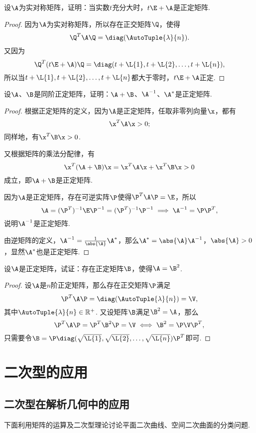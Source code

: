 \begin{example}
设\(\A\)为实对称矩阵，证明：当实数\(t\)充分大时，\(t\E+\A\)是正定矩阵.
\begin{proof}
因为\(\A\)为实对称矩阵，所以存在正交矩阵\(\Q\)，使得\[
\Q^T\A\Q = \diag(\AutoTuple{\lambda}{n}).
\]又因为\[
\Q^T(t\E+\A)\Q
= \diag(t+\L{1},t+\L{2},\dotsc,t+\L{n}),
\]所以当\(t+\L{1},t+\L{2},\dotsc,t+\L{n}\)都大于零时，\(t\E+\A\)正定.
\end{proof}
\end{example}

\begin{example}
设\(\A\)、\(\B\)是同阶正定矩阵，证明：\(\A+\B\)、\(\A^{-1}\)、\(\A^*\)是正定矩阵.
\begin{proof}
根据正定矩阵的定义，因为\(\A\)是正定矩阵，任取非零列向量\(\x\)，都有\[
\x^T\A\x > 0;
\]同样地，有\(\x^T\B\x > 0\).

又根据矩阵的乘法分配律，有\[
\x^T(\A+\B)\x = \x^T\A\x + \x^T\B\x > 0
\]成立，即\(\A+\B\)是正定矩阵.

因为\(\A\)是正定矩阵，存在可逆实阵\(\P\)使得\(\P^T\A\P=\E\)，所以\[
\A = (\P^T)^{-1}\E\P^{-1} = (\P^T)^{-1}\P^{-1}
\implies
\A^{-1} = \P\P^T,
\]说明\(\A^{-1}\)是正定矩阵.

由逆矩阵的定义，\(\A^{-1}=\frac{1}{\abs{\A}}\A^*\)，那么\(\A^*=\abs{\A}\A^{-1}\)，\(\abs{\A}>0\)，显然\(\A^*\)也是正定矩阵.
\end{proof}
\end{example}

\begin{example}
设\(\A\)是正定矩阵，试证：存在正定矩阵\(\B\)，使得\(\A=\B^2\).
\begin{proof}
设\(\A\)是\(n\)阶正定矩阵，那么存在正交矩阵\(\P\)满足\[
\P^T\A\P = \diag(\AutoTuple{\lambda}{n}) = \V,
\]其中\(\AutoTuple{\lambda}{n} \in \mathbb{R}^+\).
又设矩阵\(\B\)满足\(\B^2=\A\)，那么\[
\P^T\A\P = \P^T\B^2\P = \V
\iff
\B^2 = \P\V\P^T,
\]
只需要令\(\B = \P \diag(\sqrt{\L{1}},\sqrt{\L{2}},\dotsc,\sqrt{\L{n}}) \P^T\)即可.
\end{proof}
\end{example}

\section{二次型的应用}
\subsection{二次型在解析几何中的应用}
下面利用矩阵的运算及二次型理论讨论平面二次曲线、空间二次曲面的分类问题.
